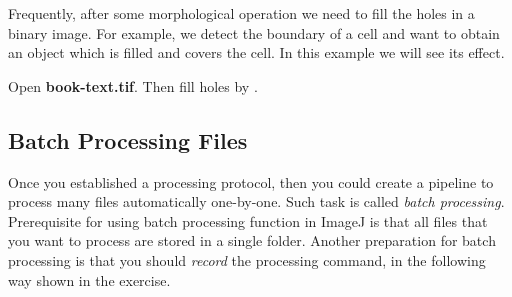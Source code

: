 Frequently, after some morphological operation we need to fill the holes
in a binary image. For example, we detect the boundary of a cell and
want to obtain an object which is filled and covers the cell. In this
example we will see its effect.

\begin{indentexercise}{1}
Open \textbf{book-text.tif}. Then fill holes by . 
\end{indentexercise}

\clearpage
\subsection{Batch Processing Files}

Once you established a processing protocol, then you could create a
pipeline to process many files automatically one-by-one. Such task is
called \textit{batch processing}.
Prerequisite for using batch processing function in ImageJ is that all
files that you want to process are stored in a single folder. Another
preparation for batch processing is that you should
\textit{record} the processing command,
in the following way shown in the exercise.




